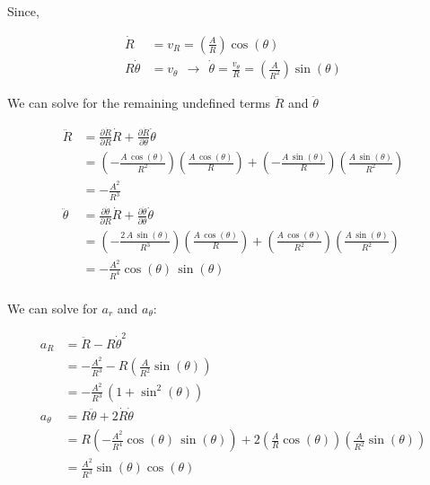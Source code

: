 \documentclass[12pt, letterpaper]{../assignment}
\begin{document}
Since,

\begin{equation*}
\begin{aligned}
\dot{R} &= v_R = \left(\frac{A}{R}\right)\cos(\theta)\\
R \dot{\theta} &= v_\theta \ \ \rightarrow \ \ \dot{\theta} = \frac{v_\theta}{R} = \left(\frac{A}{R^2}\right)\sin(\theta) 
\end{aligned}
\end{equation*}

We can solve for the remaining undefined terms $\ddot{R}$ and $\ddot{\theta}$

\begin{equation*}
   \begin{aligned}
       \ddot{R} &= \frac{\partial \dot{R}}{\partial R} \dot{R} + \frac{\partial \dot{R}}{\partial \theta} \dot{\theta}\\
       &= \left(-\frac{A\,\cos\left(\theta \right)}{R^2}\right)\left(\frac{A\,\cos\left(\theta \right)}{R}\right)
       + \left( -\frac{A\,\sin\left(\theta \right)}{R} \right)\left( \frac{A\,\sin\left(\theta \right)}{R^2} \right)\\
       &= -\frac{A^2}{R^3}\\
       \ddot{\theta} &= \frac{\partial \dot{\theta}}{\partial R} \dot{R} + \frac{\partial \dot{\theta}}{\partial \theta} \dot{\theta}\\
       &= \left( -\frac{2\,A\,\sin\left(\theta \right)}{R^3} \right)\left(\frac{A\,\cos\left(\theta \right)}{R}\right)
       + \left( \frac{A\,\cos\left(\theta \right)}{R^2} \right)\left( \frac{A\,\sin\left(\theta \right)}{R^2} \right)\\
       &= -\frac{A^2}{R^4} \cos\left(\theta \right)\,\sin\left(\theta \right)\\
   \end{aligned}
\end{equation*}

We can solve for $a_r$ and $a_\theta$:

\begin{equation*}
    \begin{aligned}
        a_R &= \ddot{R} - R \dot{\theta}^2\\
        &= -\frac{A^2}{R^3} - R \left( \frac{A}{R^2}\sin(\theta)  \right) \\
        &= -\frac{A^2}{R^3}\,\left(1+{\sin^2\left(\theta \right)}\right) \\
        a_\theta &= R \ddot{\theta} + 2 \dot{R}\dot{\theta} \\
        &= R \left( -\frac{A^2}{R^4} \cos\left(\theta \right)\,\sin\left(\theta \right) \right)
        + 2 \left( \frac{A}{R}\cos(\theta) \right) \left( \frac{A}{R^2}\sin(\theta) \right) \\
        &= \frac{A^2}{R^3}\sin(\theta)\cos(\theta)
    \end{aligned}
 \end{equation*}
\end{document}
